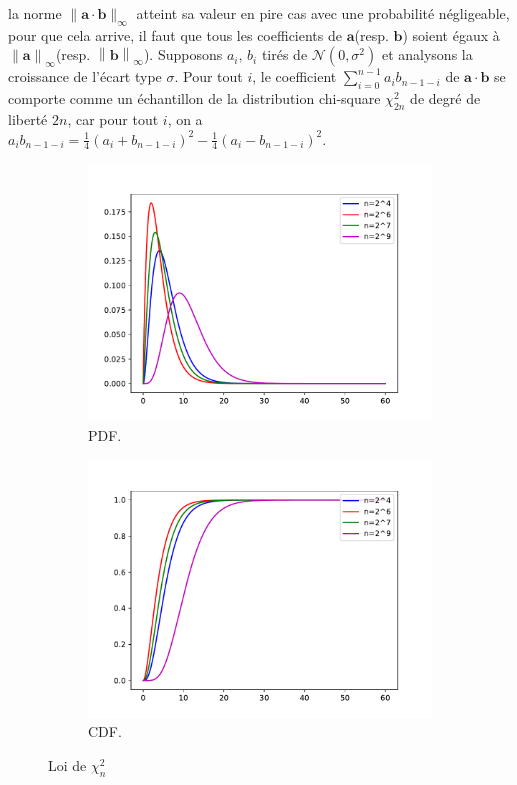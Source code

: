 \documentclass[11pt, headsepline, a4paper, fleqn, oneside]{article}
\begin{document}
la norme $\|\boldsymbol{a}\cdot \boldsymbol{b}\|_{\infty}$ atteint sa valeur en pire cas avec une probabilité négligeable, pour que cela arrive, il faut que tous les coefficients de $\boldsymbol{a}$(resp. $\boldsymbol{b}$) soient égaux à $\left\|\boldsymbol{a}\right\|_{\infty}$(resp. $\left\|\boldsymbol{b}\right\|_{\infty}$). Supposons $a_i, \, b_i$ tirés de $\mathcal{N}(0, \sigma ^2)$ et analysons la croissance de l'écart type $\sigma$. Pour tout $i$, le coefficient $\sum_{i=0}^{n-1} a_{i} b_{n-1-i}$  de $\boldsymbol{a}\cdot \boldsymbol{b}$ se comporte comme un échantillon de la distribution chi-square $\chi^2 _{2n}$ de degré de liberté $2n$, car pour tout $i$, on a $a_{i} b_{n-1-i}= \frac{1}{4}\left(a_{i}+b_{n-1-i}\right)^{2}-\frac{1}{4}\left(a_{i}-b_{n-1-i}\right)^{2}$.
\begin{figure}[ht]
  \centering
  \begin{subfigure}[b]{0.4\linewidth}
    \includegraphics[width=\linewidth]{figure_1.pdf}
    \caption{PDF.}
  \end{subfigure}
  \begin{subfigure}[b]{0.4\linewidth}
    \includegraphics[width=\linewidth]{figure_2.pdf}
    \caption{CDF.}
  \end{subfigure}
  \caption{Loi de $\chi ^2 _n$}
  \label{fig:chi}
\end{figure}
\end{document}
